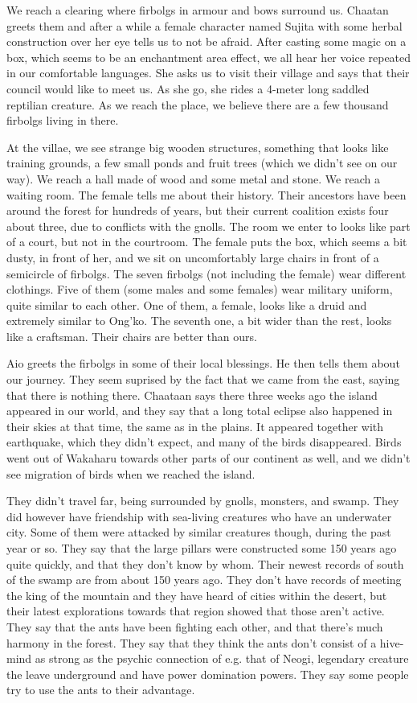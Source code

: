 \documentclass[10pt,a4paper,twoside,openany,hidelinks]{book}
\begin{document}
We reach a clearing where firbolgs in armour and bows surround us. Chaatan greets them and after a while a female character named Sujita with some herbal construction over her eye tells us to not be afraid. After casting some magic on a box, which seems to be an enchantment area effect, we all hear her voice repeated in our comfortable languages.
She asks us to visit their village and says that their council would like to meet us. As she go, she rides a 4-meter long saddled reptilian creature. As we reach the place, we believe there are a few thousand firbolgs living in there.

At the villae, we see strange big wooden structures, something that looks like training grounds, a few small ponds and fruit trees (which we didn't see on our way). We reach a hall made of wood and some metal and stone. We reach a waiting room.
The female tells me about their history. Their ancestors have been around the forest for hundreds of years, but their current coalition exists four about three, due to conflicts with the gnolls.
The room we enter to looks like part of a court, but not in the courtroom. The female puts the box, which seems a bit dusty, in front of her, and we sit on uncomfortably large chairs in front of a semicircle of firbolgs. The seven firbolgs (not including the female) wear different clothings. Five of them (some males and some females) wear military uniform, quite similar to each other. One of them, a female, looks like a druid and extremely similar to Ong'ko. The seventh one, a bit wider than the rest, looks like a craftsman. Their chairs are better than ours.

Aio greets the firbolgs in some of their local blessings. He then tells them about our journey. They seem suprised by the fact that we came from the east, saying that there is nothing there. Chaataan says there three weeks ago the island appeared in our world, and they say that a long total eclipse also happened in their skies at that time, the same as in the plains. It appeared together with earthquake, which they didn't expect, and many of the birds disappeared. Birds went out of Wakaharu towards other parts of our continent as well, and we didn't see migration of birds when we reached the island.

They didn't travel far, being surrounded by gnolls, monsters, and swamp. They did however have friendship with sea-living creatures who have an underwater city. Some of them were attacked by similar creatures though, during the past year or so.
They say that the large pillars were constructed some 150 years ago quite quickly, and that they don't know by whom. Their newest records of south of the swamp are from about 150 years ago. They don't have records of meeting the king of the mountain and they have heard of cities within the desert, but their latest explorations towards that region showed that those aren't active.
They say that the ants have been fighting each other, and that there's much harmony in the forest. They say that they think the ants don't consist of a hive-mind as strong as the psychic connection of e.g. that of Neogi, legendary creature the leave underground and have power domination powers. They say some people try to use the ants to their advantage.
\end{document}

